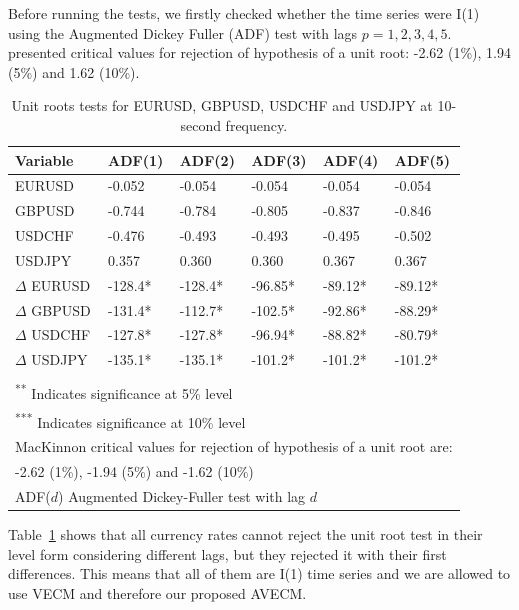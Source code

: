 Before running the tests, we firstly checked whether the time series were I(1)
using the Augmented Dickey Fuller (ADF) test with lags $p=1,2,3,4,5$.
\cite{mackinnon2010} presented critical values for rejection of hypothesis of a
unit root: -2.62 (1\%), 1.94 (5\%) and 1.62 (10\%).
\begin{table}[ht]
\label{tab:adf}
\centering
\begin{tabular}{llllll}
\toprule
{Variable} & {ADF(1)} & {ADF(2)} & {ADF(3)} & {ADF(4)} & {ADF(5)}\\ 
\midrule
EURUSD &  -0.052   & -0.054  & -0.054  & -0.054  & -0.054  \\
GBPUSD &  -0.744  & -0.784  & -0.805  & -0.837  & -0.846  \\
USDCHF &  -0.476   & -0.493  & -0.493  & -0.495  & -0.502  \\
USDJPY &  0.357   & 0.360  & 0.360  & 0.367  & 0.367  \\
$\Delta$ EURUSD & -128.4*  & -128.4*  & -96.85* & -89.12*   & -89.12*\\
$\Delta$ GBPUSD & -131.4*  & -112.7*  & -102.5* & -92.86*   & -88.29*\\
$\Delta$ USDCHF & -127.8*  & -127.8*  & -96.94* & -88.82*   & -80.79*\\
$\Delta$ USDJPY & -135.1*  & -135.1*  & -101.2* & -101.2*   & -101.2*\\
\bottomrule
\addlinespace[1ex]
\multicolumn{6}{l}{ \textsuperscript{*} Indicates significance at 1\% level} \\
\multicolumn{6}{l}{ \textsuperscript{**} Indicates significance at 5\% level} \\
\multicolumn{6}{l}{ \textsuperscript{***} Indicates significance at 10\% level} \\
\multicolumn{6}{l}{MacKinnon critical values for rejection of hypothesis of a unit root are:}\\
\multicolumn{6}{l}{ -2.62 (1\%), -1.94 (5\%) and -1.62 (10\%)}\\
\multicolumn{6}{l}{ADF($d$) Augmented Dickey-Fuller test with lag $d$} 
\end{tabular}
\caption{Unit roots tests for EURUSD, GBPUSD, USDCHF and USDJPY at 10-second
frequency.}
\end{table}
Table~\ref{tab:adf} shows that all currency rates cannot reject the unit root
test in their level form considering different lags, but they rejected it with
their first differences. This means that all of them are I(1) time series and we
are allowed to use VECM and therefore our proposed AVECM.

